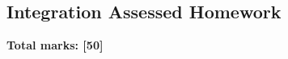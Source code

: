 \documentclass[../c1]{subfiles}
\begin{document}
\subsection*{Integration Assessed Homework}
\thispagestyle{fancy}



\begin{flushright}
\textbf{Total marks: [50]}
\end{flushright}
\end{document}
